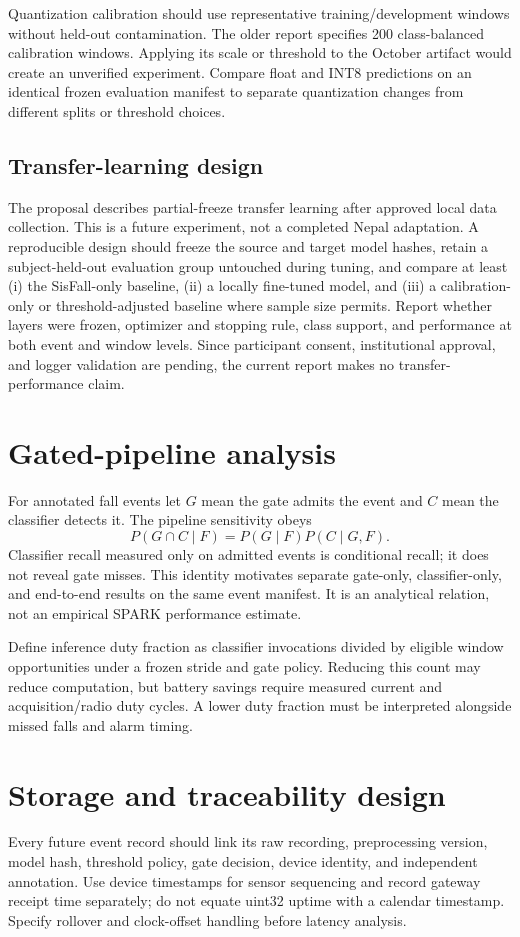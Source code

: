 Quantization calibration should use representative training/development windows without held-out contamination. The older report specifies 200 class-balanced calibration windows. Applying its scale or threshold to the October artifact would create an unverified experiment. Compare float and INT8 predictions on an identical frozen evaluation manifest to separate quantization changes from different splits or threshold choices.

\subsection{Transfer-learning design}
The proposal describes partial-freeze transfer learning after approved local data collection. This is a future experiment, not a completed Nepal adaptation. A reproducible design should freeze the source and target model hashes, retain a subject-held-out evaluation group untouched during tuning, and compare at least (i) the SisFall-only baseline, (ii) a locally fine-tuned model, and (iii) a calibration-only or threshold-adjusted baseline where sample size permits. Report whether layers were frozen, optimizer and stopping rule, class support, and performance at both event and window levels. Since participant consent, institutional approval, and logger validation are pending, the current report makes no transfer-performance claim.

\section{Gated-pipeline analysis}
For annotated fall events let $G$ mean the gate admits the event and $C$ mean the classifier detects it. The pipeline sensitivity obeys
\[
 P(G\cap C\mid F)=P(G\mid F)P(C\mid G,F).
\]
Classifier recall measured only on admitted events is conditional recall; it does not reveal gate misses. This identity motivates separate gate-only, classifier-only, and end-to-end results on the same event manifest. It is an analytical relation, not an empirical SPARK performance estimate.

Define inference duty fraction as classifier invocations divided by eligible window opportunities under a frozen stride and gate policy. Reducing this count may reduce computation, but battery savings require measured current and acquisition/radio duty cycles. A lower duty fraction must be interpreted alongside missed falls and alarm timing.

\section{Storage and traceability design}
Every future event record should link its raw recording, preprocessing version, model hash, threshold policy, gate decision, device identity, and independent annotation. Use device timestamps for sensor sequencing and record gateway receipt time separately; do not equate uint32 uptime with a calendar timestamp. Specify rollover and clock-offset handling before latency analysis.

